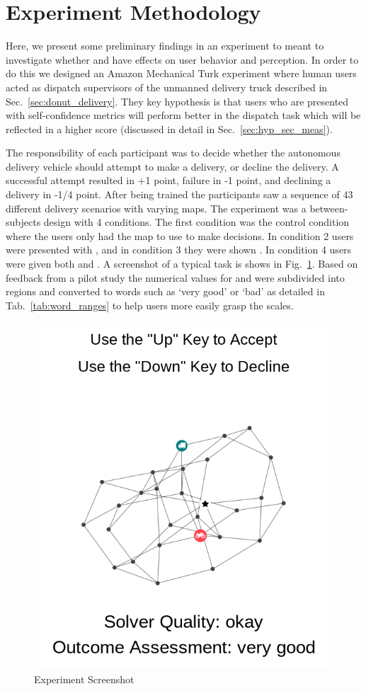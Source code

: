 \section{Experiment Methodology} \label{sec:methodology}
    Here, we present some preliminary findings in an experiment to meant to investigate whether \xQ{} and \xO{} have effects on user behavior and perception. In order to do this we designed an Amazon Mechanical Turk experiment where human users acted as dispatch supervisors of the unmanned delivery truck described in Sec.~\ref{sec:donut_delivery}. They key hypothesis is that users who are presented with self-confidence metrics will perform better in the dispatch task which will be reflected in a higher score (discussed in detail in Sec.~\ref{sec:hyp_sec_meas}).

    The responsibility of each participant was to decide whether the autonomous delivery vehicle should attempt to make a delivery, or decline the delivery. A successful attempt resulted in +1 point, failure in -1 point, and declining a delivery in -1/4 point. After being trained the participants saw a sequence of 43 different delivery scenarios with varying maps. The experiment was a between-subjects design with 4 conditions. The first condition was the control condition where the users only had the map to use to make decisions. In condition 2 users were presented with \xQ{}, and in condition 3 they were shown \xO. In condition 4 users were given both \xQ{} and \xO. A screenshot of a typical task is shows in Fig.~\ref{fig:screenshot}. Based on feedback from a pilot study the numerical values for \xQ{} and \xP{} were subdivided into regions and converted to words such as `very good' or `bad' as detailed in Tab.~\ref{tab:word_ranges} to help users more easily grasp the scales.

       \begin{figure}[tb]
            \centering
            \includegraphics[width=0.8\linewidth]{Figures/experiment_screenshot}
            \caption{Experiment Screenshot}
            \label{fig:screenshot}
        \end{figure}

